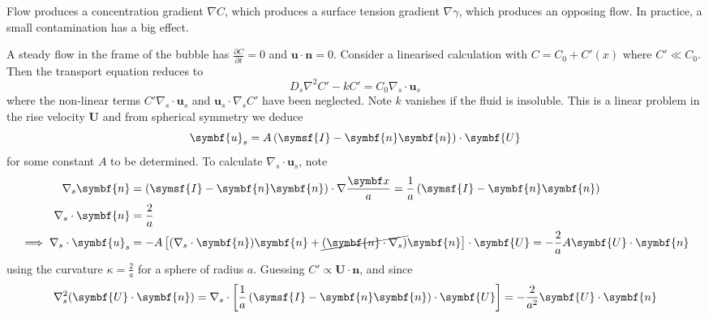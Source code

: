 \documentclass{jknotes}
\begin{document}
\begin{eg}
\begin{enumerate}
\begin{center}
			\end{center}
			Flow produces a concentration gradient $\nabla C$, which produces
			a surface tension gradient $\nabla \gamma$, which produces an
			opposing flow. In practice, a small contamination has a big effect.
	\end{enumerate}
\end{eg}

A steady flow in the frame of the bubble has $\frac{\partial C}{\partial t} =
0$ and $\symbf{u} \cdot \symbf{n} = 0$. Consider a linearised calculation with
$C = C_0 + C'(x)$ where $C' \ll C_0$. Then the transport equation reduces to
\begin{equation}
	D_s \nabla^2 C' - kC' = C_0 \nabla_s \cdot \symbf{u}_s
\end{equation}
where the non-linear terms $C' \nabla_s \cdot \symbf{u}_s$ and $\symbf{u}_s
\cdot \nabla_s C'$ have been neglected. Note $k$ vanishes if the fluid is
insoluble. This is a linear problem in the rise
velocity $\symbf{U}$ and from spherical symmetry we deduce
\begin{equation}
	\symbf{u}_s = A \left( \symsf{I} - \symbf{n}\symbf{n}\right)\cdot\symbf{U}
\end{equation}
for some constant $A$ to be determined. To calculate $\nabla_s \cdot \symbf{u}_s$, note
\begin{align}
	\nabla_s \symbf{n} &= \left( \symsf{I} - \symbf{n}\symbf{n}\right)\cdot
	\nabla \frac{\x}{a} = \frac{1}{a} \left( \symsf{I} -
	\symbf{n}\symbf{n}\right) \\
	\nabla_s \cdot \symbf{n} &= \frac{2}{a} \\
	\implies \nabla_s \cdot \symbf{u}_s &= -A \left[ (\nabla_s \cdot
		\symbf{n})\symbf{n} +
		\cancel{(\symbf{n}\cdot\nabla_s)}\symbf{n}\right]\cdot\symbf{U} =
		-\frac{2}{a} A\symbf{U}\cdot\symbf{n}
\end{align}
using the curvature $\kappa = \frac{2}{a}$ for a sphere of radius $a$.
Guessing $C' \propto \symbf{U}\cdot\symbf{n}$, and since 
\begin{equation}
	\nabla_s^2(\symbf{U}\cdot\symbf{n}) = \nabla_s \cdot \left[
	\frac{1}{a}\left(\symsf{I}-\symbf{n}\symbf{n}\right)\cdot\symbf{U}\right]
	= -\frac{2}{a^2}\symbf{U}\cdot\symbf{n}
\end{equation}
\end{document}
